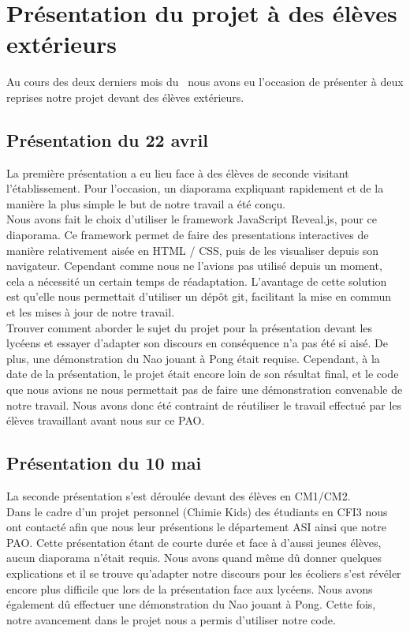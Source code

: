 \section{Présentation du projet à des élèves extérieurs}
\label{sec:Présentation du projet à des élèves extérieurs}
  \par Au cours des deux derniers mois du \pao\ nous avons eu l'occasion de présenter à deux reprises notre projet devant des élèves extérieurs.\\

  \subsection{Présentation du 22 avril}
  \label{sub:Présentation du 22 avril}
    \par La première présentation a eu lieu face à des élèves de seconde visitant l'établissement.
    Pour l'occasion, un diaporama expliquant rapidement et de la manière la plus simple le but de notre travail a été conçu.\\
    Nous avons fait le choix d'utiliser le framework JavaScript Reveal.js, pour ce diaporama. 
    Ce framework permet de faire des presentations interactives de manière relativement aisée en HTML / CSS, puis de les visualiser depuis son navigateur. Cependant comme nous ne l’avions pas utilisé depuis un moment, cela a nécessité un certain temps de réadaptation.
    L'avantage de cette solution est qu'elle nous permettait d'utiliser un dépôt git, facilitant la mise en commun et les mises à jour de notre travail.\\
    Trouver comment aborder le sujet du projet pour la présentation devant les lycéens et essayer d’adapter son discours en conséquence n’a pas été si aisé.
    De plus, une démonstration du Nao jouant à Pong était requise.
    Cependant, à la date de la présentation, le projet était encore loin de son résultat final, et le code que nous avions ne nous permettait pas de faire une démonstration convenable de notre travail.
    Nous avons donc été contraint de réutiliser le travail effectué par les élèves travaillant avant nous sur ce PAO.\\

  \subsection{Présentation du 10 mai}
  \label{sub:Présentation du 10 mai}
    \par La seconde présentation s'est déroulée devant des élèves en CM1/CM2. \\
    Dans le cadre d'un projet personnel (Chimie Kids) des étudiants en CFI3 nous ont contacté afin que nous leur présentions le département ASI ainsi que notre PAO.
    Cette présentation étant de courte durée et face à d'aussi jeunes élèves, aucun diaporama n'était requis. Nous avons quand même dû donner quelques explications et il se trouve qu'adapter notre discours pour les écoliers s'est révéler encore plus difficile que lors de la présentation face aux lycéens.
    Nous avons également dû effectuer une démonstration du Nao jouant à Pong.
    Cette fois, notre avancement dans le projet nous a permis d'utiliser notre code.
\pagebreak
